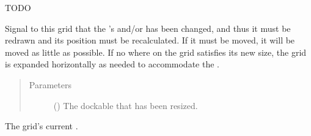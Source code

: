 \documentclass[letterpaper,10pt,english]{sphinxmanual}
\begin{document}
\begin{fulllineitems}
\label{\detokenize{api:gui.core.Grid}}
TODO

\begin{fulllineitems}
\label{\detokenize{api:gui.core.Grid.dockable_resized}}
Signal to this grid that the  ’s  and/or
 has been changed, and thus it must be redrawn and its position must be recalculated.
If it must be moved, it will be moved as little as possible. If no where on the grid satisfies its new size, the
grid is expanded horizontally as needed to accommodate the .
\begin{quote}\begin{description}
\item[{Parameters}] \leavevmode
{} () \textendash{} The dockable that has been resized.

\end{description}\end{quote}

\end{fulllineitems}


\begin{fulllineitems}
\label{\detokenize{api:gui.core.Grid.geometry}}
The grid’s current .

\end{fulllineitems}


\end{fulllineitems}
\end{document}
